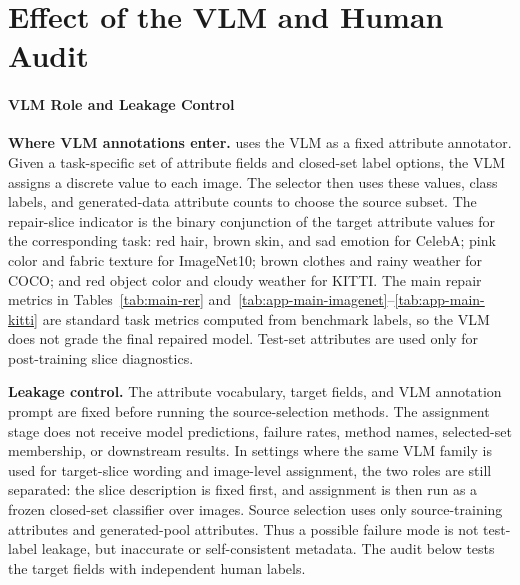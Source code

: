 \section{Effect of the VLM and Human Audit}
\label{app:vlm-human-audit}

\paragraph{VLM Role and Leakage Control}
\textbf{Where VLM annotations enter.}
\model uses the VLM as a fixed attribute annotator. Given a task-specific set of attribute fields and closed-set label options, the VLM assigns a discrete value to each image. The selector then uses these values, class labels, and generated-data attribute counts to choose the source subset. The repair-slice indicator is the binary conjunction of the target attribute values for the corresponding task: red hair, brown skin, and sad emotion for CelebA; pink color and fabric texture for ImageNet10; brown clothes and rainy weather for COCO; and red object color and cloudy weather for KITTI. The main repair metrics in Tables~\ref{tab:main-rer} and~\ref{tab:app-main-imagenet}--\ref{tab:app-main-kitti} are standard task metrics computed from benchmark labels, so the VLM does not grade the final repaired model. Test-set attributes are used only for post-training slice diagnostics.

\vspace{0.5em}
\textbf{Leakage control.}
The attribute vocabulary, target fields, and VLM annotation prompt are fixed before running the source-selection methods. The assignment stage does not receive model predictions, failure rates, method names, selected-set membership, or downstream results. In settings where the same VLM family is used for target-slice wording and image-level assignment, the two roles are still separated: the slice description is fixed first, and assignment is then run as a frozen closed-set classifier over images. Source selection uses only source-training attributes and generated-pool attributes. Thus a possible failure mode is not test-label leakage, but inaccurate or self-consistent metadata. The audit below tests the target fields with independent human labels.

